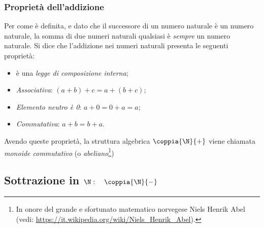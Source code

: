 \subsubsection{Proprietà dell'addizione}

Per come è definita, e dato che il successore di un numero naturale è un 
numero naturale, la somma di due numeri naturali qualsiasi è \emph{sempre} 
un numero naturale. 
Si dice che l'addizione nei numeri naturali presenta le seguenti proprietà:

\begin{itemize} [noitemsep]
 \item è una \emph{legge di composizione interna};
 \item \emph{Associativa}: \quad \((a + b) + c = a + (b + c)\);
 \item \emph{Elemento neutro è 0}: \quad \(a + 0 = 0 + a = a\);
 \item \emph{Commutativa}: \quad \(a + b = b + a\).
\end{itemize}

Avendo queste proprietà, la struttura algebrica \(\coppia{\N}{+}\) 
\indc{\(\N\)}{\(\coppia{\N}{+}\)}viene 
chiamata \emph{monoide commutativo} (o \emph{abeliano}\footnote{
In onore del grande e sfortunato matematico norvegese Niels Henrik Abel\\ 
(vedi: \url{https://it.wikipedia.org/wiki/Niels_Henrik_Abel}).})


\subsection{Sottrazione in 
\texorpdfstring{$\N: \quad \coppia{\N}{-}$}{N: (N; -)}}

